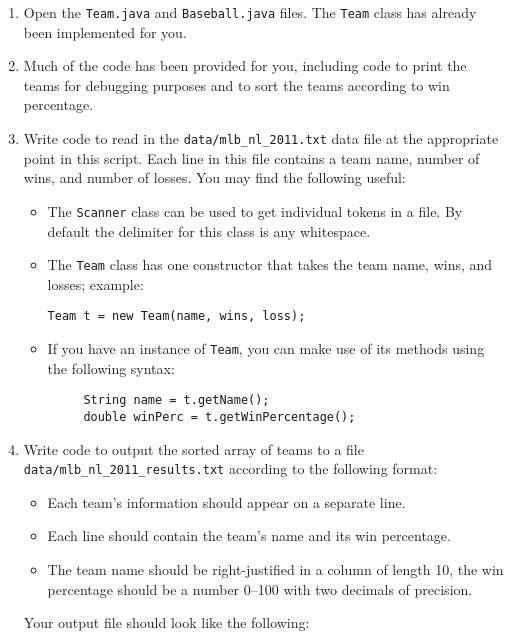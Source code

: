 \documentclass[12pt]{scrartcl}
\begin{document}
\begin{enumerate}
  \item Open the \texttt{Team.java} and 
  	\texttt{Baseball.java} files.  The \texttt{Team} 
	class has already been implemented for you.
  \item Much of the code has been provided for you, including code to 
	print the teams for debugging purposes and to sort the teams according 
	to win percentage.
  \item Write code to read in the \texttt{data/mlb_nl_2011.txt} 
	data file at the appropriate point in this script.  Each line in this file contains a
	team name, number of wins, and number of losses.  You may find the 
	following useful:
  \begin{itemize}
	\item The \texttt{Scanner} class can be used to get
	 individual tokens in a file.  By default the delimiter for this
	 class is any whitespace.  
	\item The \texttt{Team} class has one constructor 
	 that takes the team name, wins, and losses; example:
	 
	 \texttt{Team t = new Team(name, wins, loss);}
	 
    \item If you have an instance of \texttt{Team}, you can 
	 make use of its methods using the following syntax:
	 
	 \begin{verbatim}
	 String name = t.getName();
	 double winPerc = t.getWinPercentage();
	 \end{verbatim}
  \end{itemize}
	
  \item Write code to output the sorted array of teams to a file 
  	\texttt{data/mlb_nl_2011_results.txt} according 
	to the following format:
	\begin{itemize}
	  \item Each team's information should appear on a separate line.
	  \item Each line should contain the team's name and its win percentage.
      \item The team name should be right-justified in a column of length 
	  	10, the win percentage should be a number 0--100 with two decimals 
		of precision.
	\end{itemize}
	Your output file should look like the following:


\end{enumerate}
\end{document}

